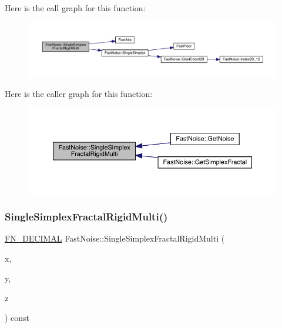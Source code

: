 Here is the call graph for this function\+:
\nopagebreak
\begin{figure}[H]
\begin{center}
\leavevmode
\includegraphics[width=350pt]{class_fast_noise_a185d239a0bbbc93f673eeb1fe49eae80_cgraph}
\end{center}
\end{figure}
Here is the caller graph for this function\+:
\nopagebreak
\begin{figure}[H]
\begin{center}
\leavevmode
\includegraphics[width=350pt]{class_fast_noise_a185d239a0bbbc93f673eeb1fe49eae80_icgraph}
\end{center}
\end{figure}
\mbox{\label{class_fast_noise_a6a1e4725751d679b33705fa5867f7525}} 
\subsubsection{\texorpdfstring{Single\+Simplex\+Fractal\+Rigid\+Multi()}{SingleSimplexFractalRigidMulti()}\hspace{0.1cm}{\footnotesize\ttfamily [2/2]}}
{\footnotesize\ttfamily \mbox{\hyperlink{_fast_noise_8h_a75a9ef6d2541c4921815b885bfd449c3}{F\+N\+\_\+\+D\+E\+C\+I\+M\+AL}} Fast\+Noise\+::\+Single\+Simplex\+Fractal\+Rigid\+Multi (\begin{DoxyParamCaption}\item[{\mbox{\hyperlink{_fast_noise_8h_a75a9ef6d2541c4921815b885bfd449c3}{F\+N\+\_\+\+D\+E\+C\+I\+M\+AL}}}]{x,  }\item[{\mbox{\hyperlink{_fast_noise_8h_a75a9ef6d2541c4921815b885bfd449c3}{F\+N\+\_\+\+D\+E\+C\+I\+M\+AL}}}]{y,  }\item[{\mbox{\hyperlink{_fast_noise_8h_a75a9ef6d2541c4921815b885bfd449c3}{F\+N\+\_\+\+D\+E\+C\+I\+M\+AL}}}]{z }\end{DoxyParamCaption}) const\hspace{0.3cm}{\ttfamily [private]}}

